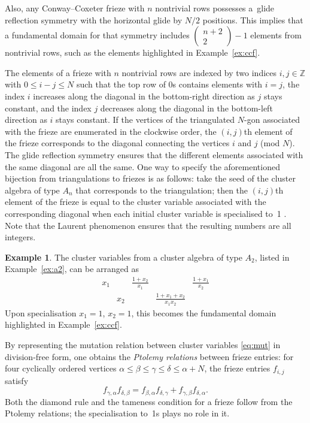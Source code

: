 \documentclass[12pt]{article}
\theoremstyle{definition}
\newtheorem{example}{Example}
\newcommand{\Z}{\mathbb{Z}}
\begin{document}
Also, any Conway--Coxeter frieze with $n$ nontrivial rows possesses a~glide reflection symmetry with the horizontal glide by $N/2$ positions. This implies that a fundamental domain for that symmetry includes $\left(\begin{smallmatrix}n+2\\2\end{smallmatrix}\right)-1$ elements from nontrivial rows, such as the elements highlighted in Example~\ref{ex:ccf}.

The elements of a frieze with $n$ nontrivial rows are indexed by two indices $i,j\in\Z$ with $0\leqslant i-j \leqslant N$ such that the top row of $0$s contains elements with $i=j$, the index $i$ increases along the diagonal in the bottom-right direction as $j$ stays constant, and the index $j$ decreases along the diagonal in the bottom-left direction as $i$ stays constant. If the vertices of the triangulated $N$-gon associated with the frieze are enumerated in the clockwise order, the $(i,j)$th element of the frieze corresponds to the diagonal connecting the vertices $i$ and $j$ (mod $N$). The glide reflection symmetry ensures that the different elements associated with the same diagonal are all the same. One way to specify the aforementioned bijection from triangulations to friezes is as follows: take the seed of the cluster algebra of type $A_n$ that corresponds to the triangulation; then the $(i,j)$th element of the frieze is equal to the cluster variable associated with the corresponding diagonal when each initial cluster variable is specialised to~1 \cite{CC06}. Note that the Laurent phenomenon ensures that the resulting numbers are all integers.

\begin{example}
\label{ex:genfr}
The cluster variables from a cluster algebra of type $A_2$, listed in Example~\ref{ex:a2}, can be arranged as
\[
\begin{matrix}
x_1 && \frac{1+x_2}{x_1} && \frac{1+x_1}{x_2} \\
& x_2 && \frac{1+x_1+x_2}{x_1x_2}
\end{matrix}
\]
Upon specialisation $x_1=1$, $x_2=1$, this becomes the fundamental domain highlighted in Example~\ref{ex:ccf}.
\end{example}
By representing the mutation relation between cluster variables \eqref{eq:mut} in division-free form, one obtains the \emph{Ptolemy relations} between frieze entries: for four cyclically ordered vertices $\alpha\leqslant\beta\leqslant\gamma\leqslant\delta\leqslant\alpha+N$, the frieze entries $f_{i,j}$ satisfy
\[
f_{\gamma,\alpha}f_{\delta,\beta} = f_{\beta,\alpha}f_{\delta,\gamma}+f_{\gamma,\beta}f_{\delta,\alpha}.
\]
Both the diamond rule and the tameness condition for a frieze follow from the Ptolemy relations; the specialisation to~1s plays no role in it.
\end{document}

